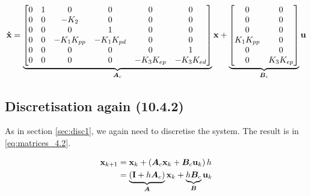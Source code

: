 \begin{equation}\label{eq:matrices}
	\mathbf{\dot{x}} =
	\underbrace{
		\begin{bmatrix}
			0 & 1 & 0				& 0				& 0				& 0				\\
			0 & 0 & -K_{2}			& 0				& 0				& 0				\\
			0 & 0 & 0				& 1				& 0				& 0				\\
			0 & 0 & -K_{1}K_{pp}	& -K_{1}K_{pd}	& 0				& 0				\\
			0 & 0 & 0				& 0 			& 0				& 1				\\
			0 & 0 & 0				& 0				& -K_{3}K_{ep}	& -K_{3}K_{ed}	\\
		\end{bmatrix}
	}_{\bm{A}_{c}}
	\mathbf{x} +
	\underbrace{
		\begin{bmatrix}
			0			& 0				\\
			0			& 0				\\
			0			& 0				\\
			K_{1}K_{pp}	& 0				\\
			0			& 0				\\
			0			& K_{3}K_{ep}	\\
		\end{bmatrix}
	}_{\bm{B}_{c}}
	\mathbf{u}
\end{equation}

\subsection{Discretisation again (10.4.2)}
As in section \ref{sec:disc1}, we again need to discretise the system. The result is in \eqref{eq:matrices_4.2}.

\begin{subequations}
\begin{align}
	\mathbf{x}_{k+1}	&= \mathbf{x}_{k} + \left( \bm{A}_{c} \mathbf{x}_{k} + \bm{B}_{c} \mathbf{u}_{k} \right) h \\
				&= \underbrace{\left( \mathbf{I} + h \bm{A}_{c} \right)}_{\bm{A}} \mathbf{x}_{k}
				+ \underbrace{h \bm{B}_{c}}_{\bm{B}} \mathbf{u}_{k} \\
\end{align}
\end{subequations}

